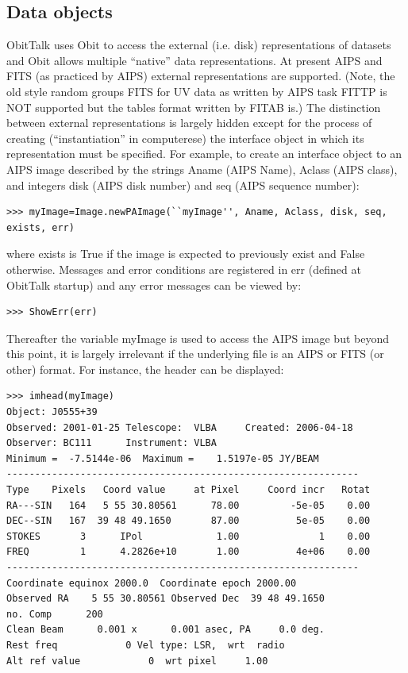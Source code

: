 \documentclass[11pt]{report}
\begin{document}
\subsection {Data objects}
ObitTalk uses Obit to access the external (i.e. disk) representations
of datasets and Obit allows multiple ``native'' data representations.
At present AIPS and FITS (as practiced by AIPS) external
representations are supported.
(Note, the old style random groups FITS for UV data as written by AIPS
task FITTP is NOT supported but the tables format written by FITAB is.)
The distinction between external representations is largely hidden
except for the process of creating (``instantiation'' in computerese)
the interface object in which its representation must be specified.
For example, to create an interface object to an AIPS image described
by the strings Aname (AIPS Name), Aclass (AIPS class), and integers
disk (AIPS disk number) and seq (AIPS sequence number):
\begin{verbatim}
>>> myImage=Image.newPAImage(``myImage'', Aname, Aclass, disk, seq, exists, err)
\end{verbatim}
where exists is True if the image is expected to previously exist and
False otherwise.
Messages and error conditions are registered in err (defined at
ObitTalk startup) and any error messages can be viewed by:
\begin{verbatim}
>>> ShowErr(err)
\end{verbatim}
Thereafter the variable myImage is used to access the AIPS image but
beyond this point, it is largely irrelevant if the underlying file is
an AIPS or FITS (or other) format.
For instance, the header can be displayed:
\begin{verbatim}
>>> imhead(myImage)
Object: J0555+39
Observed: 2001-01-25 Telescope:  VLBA     Created: 2006-04-18
Observer: BC111      Instrument: VLBA     
Minimum =  -7.5144e-06  Maximum =    1.5197e-05 JY/BEAM 
--------------------------------------------------------------
Type    Pixels   Coord value     at Pixel     Coord incr   Rotat
RA---SIN   164   5 55 30.80561      78.00         -5e-05    0.00
DEC--SIN   167  39 48 49.1650       87.00          5e-05    0.00
STOKES       3      IPol             1.00              1    0.00
FREQ         1      4.2826e+10       1.00          4e+06    0.00
--------------------------------------------------------------
Coordinate equinox 2000.0  Coordinate epoch 2000.00
Observed RA    5 55 30.80561 Observed Dec  39 48 49.1650 
no. Comp      200
Clean Beam      0.001 x      0.001 asec, PA     0.0 deg.
Rest freq            0 Vel type: LSR,  wrt  radio
Alt ref value            0  wrt pixel     1.00
\end{verbatim}
\end{document}
